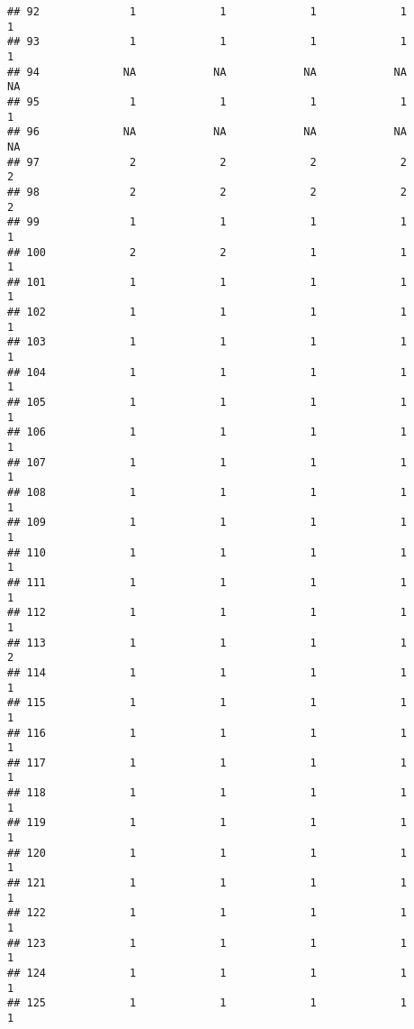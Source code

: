 \documentclass[
]{article}
\begin{document}
\begin{verbatim}
## 92              1             1             1             1             1
## 93              1             1             1             1             1
## 94             NA            NA            NA            NA            NA
## 95              1             1             1             1             1
## 96             NA            NA            NA            NA            NA
## 97              2             2             2             2             2
## 98              2             2             2             2             2
## 99              1             1             1             1             1
## 100             2             2             1             1             1
## 101             1             1             1             1             1
## 102             1             1             1             1             1
## 103             1             1             1             1             1
## 104             1             1             1             1             1
## 105             1             1             1             1             1
## 106             1             1             1             1             1
## 107             1             1             1             1             1
## 108             1             1             1             1             1
## 109             1             1             1             1             1
## 110             1             1             1             1             1
## 111             1             1             1             1             1
## 112             1             1             1             1             1
## 113             1             1             1             1             2
## 114             1             1             1             1             1
## 115             1             1             1             1             1
## 116             1             1             1             1             1
## 117             1             1             1             1             1
## 118             1             1             1             1             1
## 119             1             1             1             1             1
## 120             1             1             1             1             1
## 121             1             1             1             1             1
## 122             1             1             1             1             1
## 123             1             1             1             1             1
## 124             1             1             1             1             1
## 125             1             1             1             1             1

\end{verbatim}
\end{document}
